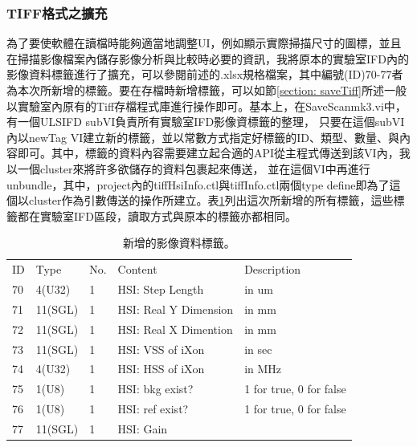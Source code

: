 \documentclass[12pt]{article}
\begin{document}
\subsubsection{TIFF格式之擴充}
為了要使軟體在讀檔時能夠適當地調整UI，例如顯示實際掃描尺寸的圖標，並且在掃描影像檔案內儲存影像分析與比較時必要的資訊，我將原本的實驗室IFD內的影像資料標籤進行了擴充，可以參閱前述的.xlsx規格檔案，其中編號(ID)70-77者
為本次所新增的標籤。要在存檔時新增標籤，可以如節\ref{section: saveTiff}所述一般以實驗室內原有的Tiff存檔程式庫進行操作即可。基本上，在SaveScan\textunderscore mk3.vi中，有一個ULSIFD subVI負責所有實驗室IFD影像資標籤的整理，
只要在這個subVI內以newTag VI建立新的標籤，並以常數方式指定好標籤的ID、類型、數量、與內容即可。其中，標籤的資料內容需要建立起合適的API從主程式傳送到該VI內，我以一個cluster來將許多欲儲存的資料包裹起來傳送，
並在這個VI中再進行unbundle，其中，project內的tiffHsiInfo.ctl與tiffInfo.ctl兩個type define即為了這個以cluster作為引數傳送的操作所建立。表\ref{tab: new tag}列出這次所新增的所有標籤，這些標籤都在實驗室IFD區段，讀取方式與原本的標籤亦都相同。
\begin{table}[ht]
    \begin{tabular}{lllll}
        ID & Type    & No. & Content               & Description             \\
        70 & 4(U32)  & 1   & HSI: Step Length      & in um                   \\
        71 & 11(SGL) & 1   & HSI: Real Y Dimension & in mm                   \\
        72 & 11(SGL) & 1   & HSI: Real X Dimention & in mm                   \\
        73 & 11(SGL) & 1   & HSI: VSS of iXon      & in sec                  \\
        74 & 4(U32)  & 1   & HSI: HSS of iXon      & in MHz                  \\
        75 & 1(U8)   & 1   & HSI: bkg exist?       & 1 for true, 0 for false \\
        76 & 1(U8)   & 1   & HSI: ref exist?       & 1 for true, 0 for false \\
        77 & 11(SGL) & 1   & HSI: Gain             &
    \end{tabular}
    \caption{新增的影像資料標籤。}
    \label{tab: new tag}
\end{table}
\end{document}
